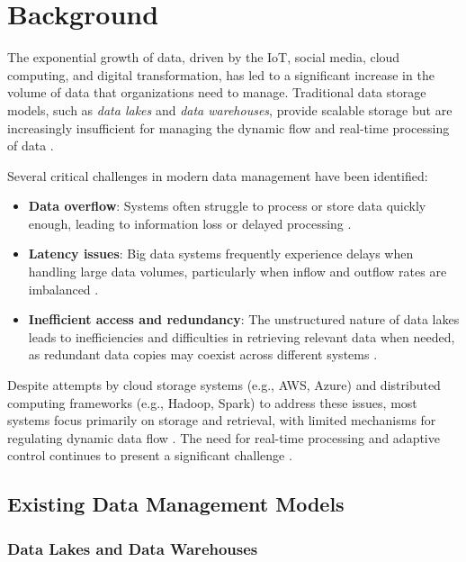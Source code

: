 \section{Background}

The exponential growth of data, driven by the IoT, social media, cloud computing, and digital transformation, has led to a significant increase in the volume of data that organizations need to manage. Traditional data storage models, such as \textit{data lakes} and \textit{data warehouses}, provide scalable storage but are increasingly insufficient for managing the dynamic flow and real-time processing of data \cite{galliers2014strategic,hsu2015data,kleppmann2017designing}.

Several critical challenges in modern data management have been identified:
\begin{itemize}
    \item \textbf{Data overflow}: Systems often struggle to process or store data quickly enough, leading to information loss or delayed processing \cite{tabesh2019implementing,zhang2015memory}.
    \item \textbf{Latency issues}: Big data systems frequently experience delays when handling large data volumes, particularly when inflow and outflow rates are imbalanced \cite{clapp2015quantifying,tian2015latency}.
    \item \textbf{Inefficient access and redundancy}: The unstructured nature of data lakes leads to inefficiencies and difficulties in retrieving relevant data when needed, as redundant data copies may coexist across different systems \cite{gupta2018practical,azzabi2024data}.
\end{itemize}

Despite attempts by cloud storage systems (e.g., AWS, Azure) and distributed computing frameworks (e.g., Hadoop, Spark) to address these issues, most systems focus primarily on storage and retrieval, with limited mechanisms for regulating dynamic data flow \cite{hashem2015rise, khalid2021comparative,barika2019orchestrating}. The need for real-time processing and adaptive control continues to present a significant challenge \cite{nambiar2022overview}.

\subsection{Existing Data Management Models}

\subsubsection{Data Lakes and Data Warehouses}

